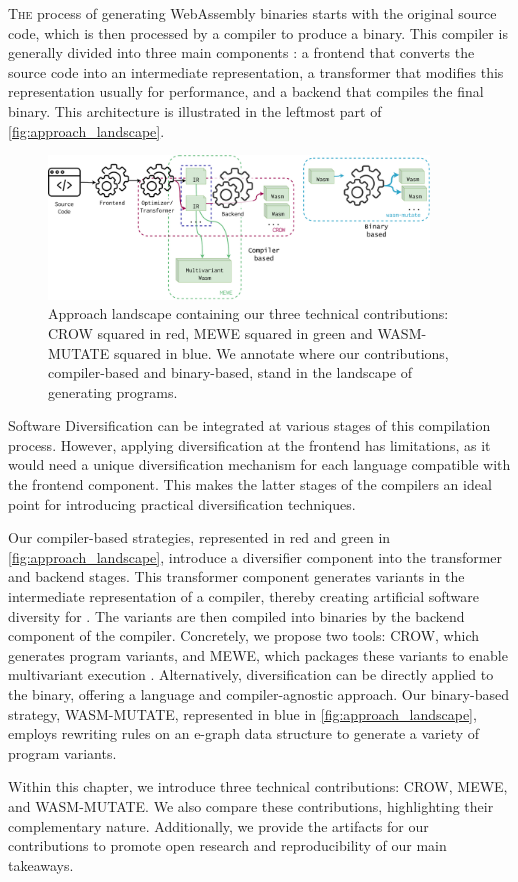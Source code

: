 
\lettrine[lines=3]{T}{he} process of generating WebAssembly binaries starts with the original source code, which is then processed by a compiler to produce a \Wasm binary. 
This compiler is generally divided into three main components \cite{10.5555/6448}: a frontend that converts the source code into an intermediate representation, a transformer that modifies this representation usually for performance, and a backend that compiles the final \Wasm binary.
This architecture is illustrated in the leftmost part of \autoref{fig:approach_landscape}.

\begin{figure}[h]
	\centering
	\includegraphics[width=0.9\textwidth]{figures/landscape.pdf}
	\caption{Approach landscape containing our three technical contributions: CROW squared in red, MEWE squared in green and WASM-MUTATE squared in blue. We annotate where our contributions, compiler-based and binary-based, stand in the landscape of generating \Wasm programs.}
	\label{fig:approach_landscape}
\end{figure}

Software Diversification can be integrated at various stages of this compilation process. 
However, applying diversification at the frontend has limitations, as it would need a unique diversification mechanism for each language compatible with the frontend component. 
This makes the latter stages of the compilers an ideal point for introducing practical \wasm diversification techniques.

Our compiler-based strategies, represented in red and green in \autoref{fig:approach_landscape}, introduce a diversifier component into the transformer and backend stages. 
This transformer component generates variants in the intermediate representation of a compiler, thereby creating artificial software diversity for \Wasm. 
The variants are then compiled into \Wasm binaries by the backend component of the compiler.
Concretely, we propose two tools: CROW, which generates \Wasm program variants, and MEWE, which packages these variants to enable multivariant execution \cite{cox06}.
Alternatively, diversification can be directly applied to the \Wasm binary, offering a language and compiler-agnostic approach. 
Our binary-based strategy, WASM-MUTATE, represented in blue in \autoref{fig:approach_landscape}, employs rewriting rules on an e-graph data structure to generate a variety of \Wasm program variants.

Within this chapter, we introduce three technical contributions: CROW, MEWE, and WASM-MUTATE.
We also compare these contributions, highlighting their complementary nature.
Additionally, we provide the artifacts for our contributions to promote open research and reproducibility of our main takeaways.


\renewcommand{\tool}{CROW\xspace}
